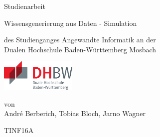 \def\doctype{Studienarbeit}
\def\title{
Wissensgenerierung aus Daten - Simulation \\
}
\def\author{André Berberich, Tobias Bloch, Jarno Wagner}

\begin{titlepage}

\vspace{10mm}

\begin{center}
	\vspace{5mm}
	
	\huge \doctype
	
	\vspace{14.2pt}
	
	\large \title
	
	
	
	
	\vspace{32.6pt}
	
	\small des Studienganges Angewandte Informatik an der \\
	\large Dualen Hochschule Baden-Württemberg Mosbach
    
    \vspace{14.2pt}
    
    \includegraphics[height=1.5cm]{prefix/image/logo-dhbw.eps}

	\vspace{42.6pt}
	
	\small von \\
	\large \author
	
	TINF16A
\end{center}

\vspace{42.6pt}



\vspace{49.7pt}


\end{titlepage}